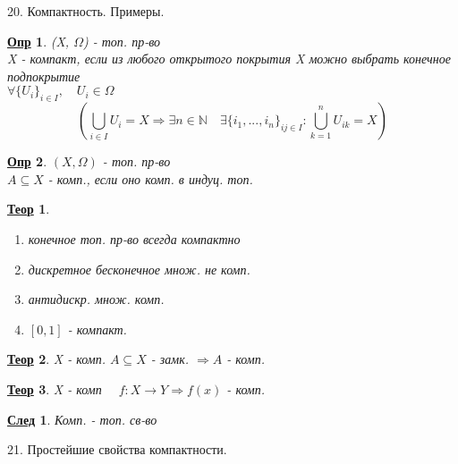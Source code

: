 \documentclass[12pt, fleqn]{article}
\newenvironment{question}[1]{\hspace*{-4em} #1}{\newpage}
\newcommand{\N}{\mathbb{N}}
\newcommand{\ra}{\Rightarrow}
\newcommand{\q}{\quad}
\theoremstyle{nonumbermarginbreak}
\newtheorem{theorem}{\hspace*{-2em}\underline{\bfseries Теор}}[section]
\newtheorem{definition}{\hspace*{-2em}\underline{\bfseries Опр}}[section]
\newtheorem{consequence}{\hspace*{-2em}\underline{\bfseries След}}[section]
\begin{document}
    \begin{question}{20. Компактность. Примеры.}
        \begin{definition} 
            (X, $\Omega$) - топ. пр-во\\
            X - компакт, если из любого открытого покрытия X можно выбрать конечное подпокрытие\\
            $\forall \{U_i\}_{i \in I},\q U_i \in \Omega$\\
            \[(\bigcup_{i \in I}U_i = X \ra \exists n \in \N \q \exists \{i_1, ..., i_n\}_{ij \in I}:
            \bigcup_{k = 1}^n U_{ik} = X)\] 
        \end{definition}

        \begin{definition} 
            $(X, \Omega)$ - топ. пр-во\\
            $A \subseteq X$ - комп., если оно комп. в индуц. топ.
        \end{definition}

        \begin{theorem} 
            \begin{enumerate}
                \item конечное топ. пр-во всегда компактно
                \item дискретное бесконечное множ. не комп.
                \item антидискр. множ. комп.
                \item  $[0, 1]$ - компакт.
            \end{enumerate}
        \end{theorem}

        \begin{theorem} 
            X - комп. $A \subseteq X$ - замк. $\ra A$ - комп.
        \end{theorem}

        \begin{theorem} 
            X - комп $\q f:X \rightarrow Y \ra f(x)$ - комп.
        \end{theorem}

        \begin{consequence} 
            Комп. - топ. св-во
        \end{consequence}
    \end{question}

    \begin{question}{21. Простейшие свойства компактности.}
        
    \end{question}
\end{document}
